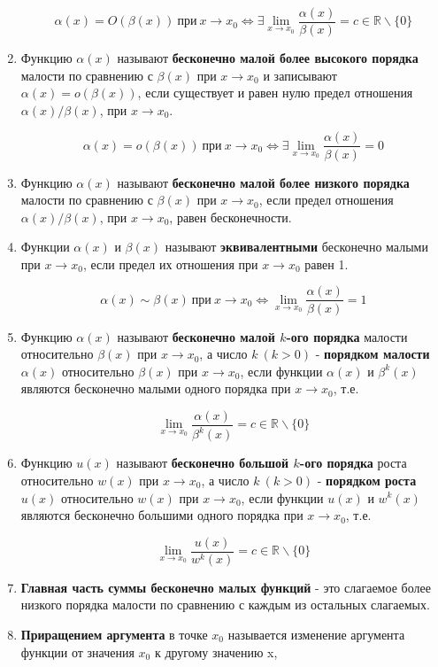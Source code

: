 \begin{enumerate}
$$\alpha(x) = O(\beta(x)) \ \text{при} \ x \rightarrow x_0 \iff \exists \lim\limits_{x \to x_0} {\dfrac{\alpha(x)}{\beta(x)}} = c \in \mathbb{R} \backslash \{0\}
    $$
\item Функцию $\alpha(x)$ называют \textbf{бесконечно малой более высокого порядка} малости по сравнению с $\beta(x)$ при $x \rightarrow x_0$ и записывают $\alpha(x) = o(\beta(x))$, если существует и равен нулю предел отношения $\alpha(x) / \beta(x)$, при $x \rightarrow x_0$.

$$\alpha(x) = o(\beta(x)) \ \text{при} \ x \rightarrow x_0 \iff \exists \lim\limits_{x \to x_0} {\dfrac{\alpha(x)}{\beta(x)}} = 0
    $$
\item Функцию $\alpha(x)$ называют \textbf{бесконечно малой более низкого порядка} малости по сравнению с $\beta(x)$ при $x \rightarrow x_0$, если предел отношения $\alpha(x) / \beta(x)$, при $x \rightarrow x_0$, равен бесконечности.
\item Функции $\alpha(x)$ и $\beta(x)$ называют \textbf{эквивалентными} бесконечно малыми при $x \rightarrow x_0$, если предел их отношения при $x \rightarrow x_0$ равен 1.

$$\alpha(x) \sim \beta(x) \ \text{при} \ x \rightarrow x_0 \iff \lim\limits_{x \to x_0}{\dfrac{\alpha(x)}{\beta(x)}} = 1
    $$
\item Функцию $\alpha(x)$ называют \textbf{бесконечно малой $k$-ого порядка} малости относительно $\beta(x)$ при $x \rightarrow x_0$, а число $k \ (k > 0)$ - \textbf{порядком малости} $\alpha(x)$ относительно $\beta(x)$ при $x \rightarrow x_0$, если функции $\alpha(x)$ и $\beta^k(x)$ являются бесконечно малыми одного порядка при $x \rightarrow x_0$, т.е.

$$\lim\limits_{x \to x_0} {\dfrac{\alpha(x)}{\beta^k(x)}} = c \in \mathbb{R} \backslash \{0\}
    $$
\item Функцию $u(x)$ называют \textbf{бесконечно большой $k$-ого порядка} роста относительно $w(x)$ при $x \rightarrow x_0$, а число $k \ (k > 0)$ - \textbf{порядком роста} $u(x)$ относительно $w(x)$ при $x \rightarrow x_0$, если функции $u(x)$ и $w^k(x)$ являются бесконечно большими одного порядка при $x \rightarrow x_0$, т.е.

$$\lim\limits_{x \to x_0} {\dfrac{u(x)}{w^k(x)}} = c \in \mathbb{R} \backslash \{0\}
    $$
\item \textbf{Главная часть суммы бесконечно малых функций} - это слагаемое более низкого порядка малости по сравнению с каждым из остальных слагаемых.
\item \textbf{Приращением аргумента} в точке $x_0$ называется изменение аргумента функции от значения $x_0$ к другому значению x,


\end{enumerate}
